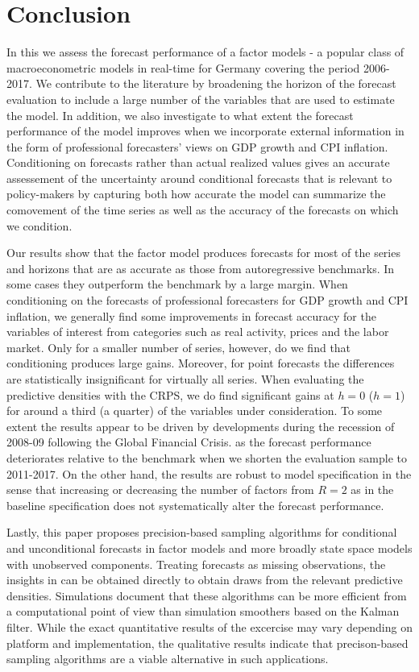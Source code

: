 \documentclass[notitlepage,a4paper,12pt]{article}
\begin{document}
\section{Conclusion}

In this we assess the forecast performance of a factor models - a popular class of macroeconometric models in real-time for Germany covering the period 2006-2017. We contribute to the literature by broadening the horizon of the forecast evaluation to include a large number of the variables that are used to estimate the model. In addition, we also investigate to what extent the forecast performance of the model improves when we incorporate external information in the form of professional forecasters' views on GDP growth and CPI inflation. Conditioning on forecasts rather than actual realized values gives an accurate assessement of the uncertainty around conditional forecasts that is relevant to policy-makers by capturing both how accurate the model can summarize the comovement of the time series as well as the accuracy of the forecasts on which we condition.

Our results show that the factor model produces forecasts for most of the series and horizons that are as accurate as those from autoregressive benchmarks. In some cases they outperform the benchmark by a large margin. When conditioning on the forecasts of professional forecasters for GDP growth and CPI inflation, we generally find some improvements in forecast accuracy for the variables of interest from categories such as real activity, prices and the labor market. Only for a smaller number of series, however, do we find that conditioning produces large gains. Moreover, for point forecasts the differences are statistically insignificant for virtually all series. When evaluating the predictive densities with the CRPS, we do find significant gains at $h=0$ ($h=1$) for around a third (a quarter) of the variables under consideration. To some extent the results appear to be driven by developments during the recession of 2008-09 following the Global Financial Crisis. as the forecast performance deteriorates relative to the benchmark when we shorten the evaluation sample to 2011-2017. On the other hand, the results are robust to model specification in the sense that increasing or decreasing the number of factors from $R=2$ as in the baseline specification does not systematically alter the forecast performance.

Lastly, this paper proposes precision-based sampling algorithms for conditional and unconditional forecasts in factor models and more broadly state space models with unobserved components. Treating forecasts as missing observations, the insights in \citet{HauberSchumacher2021} can be obtained directly to obtain draws from the relevant predictive densities. Simulations document that these algorithms can be more efficient from a computational point of view than simulation smoothers based on the Kalman filter. While the exact quantitative results of the excercise may vary depending on platform and implementation, the qualitative results indicate that precison-based sampling algorithms are a viable alternative in such applications. 
\newpage
\pagebreak
\end{document}
